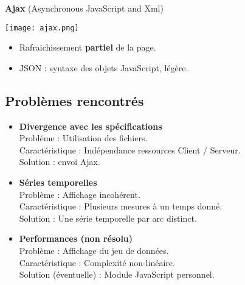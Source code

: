 		\begin{frame}
			\textbf{Ajax} (Asynchronous JavaScript and Xml)\\
				\begin{center}\texttt{[image: ajax.png]}\end{center}
				
				\begin{itemize}
				\item Rafraichissement \textbf{partiel} de la page.\\ %
				\item JSON : syntaxe des objets JavaScript, légère.
				\end{itemize}
		\end{frame}
		
		\subsection*{Problèmes rencontrés}
		\begin{frame}
			\begin{itemize}
			\item \textbf{Divergence avec les spécifications}\\
				\hspace{1em} Problème : Utilisation des fichiers.\\
				\hspace{1em} Caractéristique : Indépendance ressources Client / Serveur.\\
				\hspace{1em} Solution : envoi Ajax.\vspace{1em} \pause
				
			\item \textbf{Séries temporelles}\\
				\hspace{1em} Problème : Affichage incohérent.\\
				\hspace{1em} Caractéristique : Plusieurs mesures à un temps donné.\\
				\hspace{1em} Solution : Une série temporelle par arc distinct.\vspace{1em} \pause
				
			\item \textbf{Performances (non résolu)}\\
				\hspace{1em} Problème : Affichage du jeu de données.\\
				\hspace{1em} Caractéristique : Complexité non-linéaire.\\
				\hspace{1em} Solution (éventuelle) : Module JavaScript personnel.\pause
			\end{itemize}
		\end{frame}
	
